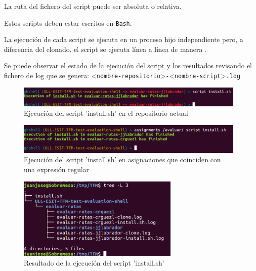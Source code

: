 	La ruta del fichero del script puede ser absoluta o relativa. 
\bigskip
	
	Estos scripts deben estar escritos en \verb|Bash|.
\bigskip

	La ejecución de cada script se ejecuta en un proceso hijo independiente pero, a diferencia del clonado, el script se ejecuta línea a línea de manera \ceit{\ref{apend1:sincrona}}. 
\bigskip
	
	Se puede observar el estado de la ejecución del script y los resultados revisando el fichero de log que se genera: \textless \verb|nombre-repositorio|\textgreater \verb|-|\textless \verb|nombre-script|\textgreater \verb|.log|
    	
    	\begin{figure}[H]
		\begin{center}
		\includegraphics[width=1\textwidth]{images/ghshell7-3}
		\caption{Ejecución del script 'install.sh' en el repositorio actual}
		\label{fig:ghshell7-3}
		\end{center}
		\end{figure}
		
        \begin{figure}[H]
		\begin{center}
		\includegraphics[width=1\textwidth]{images/ghshell7-1}
		\caption{Ejecución del script 'install.sh' en asignaciones que coinciden con una expresión regular}
		\label{fig:ghshell7-1}
		\end{center}
		\end{figure}	
		
		\begin{figure}[H]
		\begin{center}
		\includegraphics[width=0.7\textwidth]{images/ghshell7-2}
		\caption{Resultado de la ejecución del script 'install.sh'}
		\label{fig:ghshell7-2}
		\end{center}
		\end{figure}
		
